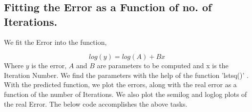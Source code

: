 \documentclass[12pt, a4paper]{report}
\begin{document}
\subsection{Fitting the Error as a Function of no. of Iterations.}
We fit the Error into the function,

\begin{equation}\label{eq:4}
log(y) = log(A)+Bx
\end{equation}
Where $y$ is the error, $A$ and $B$ are parameters to be computed and x is the Iteration Number. We find the parameters with the help of the function {\selectfont
'lstsq()'
}. With the predicted function, we plot the errors, along with the real error as a function of the number of Iterations.  We also plot the semilog and loglog plots of the real Error. The below code accomplishes the above tasks.
\\
\\

\end{document}
